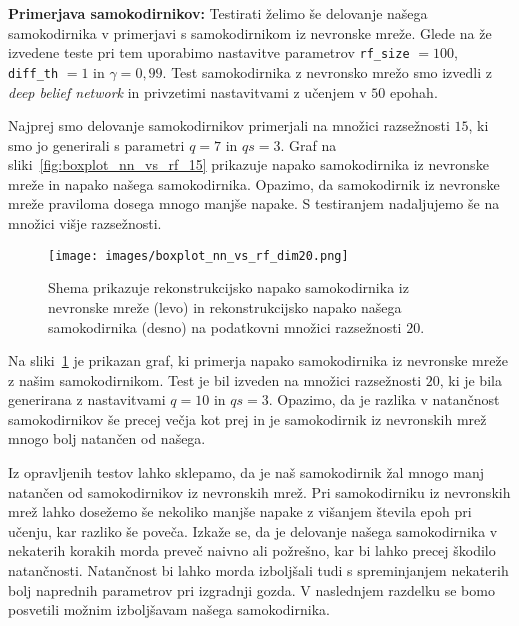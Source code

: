 \documentclass[12pt,a4paper,twoside]{article}
\theoremstyle{definition} %
\theoremstyle{plain} %
\numberwithin{equation}{section}  %
\begin{document}
\textbf{Primerjava samokodirnikov:} Testirati želimo še delovanje našega samokodirnika v primerjavi s samokodirnikom iz nevronske mreže.
Glede na že izvedene teste pri tem uporabimo nastavitve parametrov \texttt{rf\_size} $=100$, \texttt{diff\_th} $=1$ in $\gamma=0,99$.
Test samokodirnika z nevronsko mrežo smo izvedli z \emph{deep belief network} in privzetimi nastavitvami z učenjem v $50$ epohah.

Najprej smo delovanje samokodirnikov primerjali na množici razsežnosti $15$, ki smo jo generirali s parametri $q=7$ in $qs=3$.
Graf na sliki~\ref{fig:boxplot_nn_vs_rf_15} prikazuje napako samokodirnika iz nevronske mreže in napako našega samokodirnika.
Opazimo, da samokodirnik iz nevronske mreže praviloma dosega mnogo manjše napake.
S testiranjem nadaljujemo še na množici višje razsežnosti.


\begin{figure}[h]
	\centering
	\texttt{[image: images/boxplot\_nn\_vs\_rf\_dim20.png]}
	\caption[Graf za primerjavo samokodirnikov]{Shema prikazuje rekonstrukcijsko napako samokodirnika 
	iz nevronske mreže (levo) in rekonstrukcijsko napako našega samokodirnika (desno) na podatkovni množici razsežnosti $20$.}
	\label{fig:boxplot_nn_vs_rf_20}
\end{figure}

Na sliki~\ref{fig:boxplot_nn_vs_rf_20} je prikazan graf, ki primerja napako samokodirnika iz nevronske mreže z našim samokodirnikom.
Test je bil izveden na množici razsežnosti $20$, ki je bila generirana z nastavitvami $q=10$ in $qs=3$.
Opazimo, da je razlika v natančnost samokodirnikov še precej večja kot prej in je samokodirnik iz nevronskih mrež mnogo bolj natančen od našega.

Iz opravljenih testov lahko sklepamo, da je naš samokodirnik žal mnogo manj natančen od samokodirnikov iz nevronskih mrež.
Pri samokodirniku iz nevronskih mrež lahko dosežemo še nekoliko manjše napake z višanjem števila epoh pri učenju, kar razliko še poveča.
Izkaže se, da je delovanje našega samokodirnika v nekaterih korakih morda preveč naivno ali požrešno, kar bi lahko precej škodilo natančnosti.
Natančnost bi lahko morda izboljšali tudi s spreminjanjem nekaterih bolj naprednih parametrov pri izgradnji gozda.
V naslednjem razdelku se bomo posvetili možnim izboljšavam našega samokodirnika.
\end{document}
